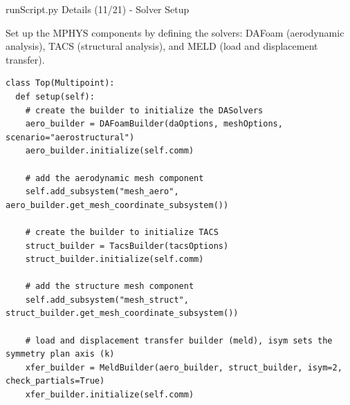 \documentclass{bredelebeamer}
\begin{document}
\begin{frame}[fragile]{runScript.py Details (11/21) - \large Solver Setup}

Set up the MPHYS components by defining the solvers: DAFoam (aerodynamic analysis), TACS (structural analysis), and MELD (load and displacement transfer).

\scriptsize
\lstset{ language=bash }
\begin{lstlisting}
class Top(Multipoint):
  def setup(self):
    # create the builder to initialize the DASolvers
    aero_builder = DAFoamBuilder(daOptions, meshOptions, scenario="aerostructural")
    aero_builder.initialize(self.comm)

    # add the aerodynamic mesh component
    self.add_subsystem("mesh_aero", aero_builder.get_mesh_coordinate_subsystem())

    # create the builder to initialize TACS
    struct_builder = TacsBuilder(tacsOptions)
    struct_builder.initialize(self.comm)

    # add the structure mesh component
    self.add_subsystem("mesh_struct", struct_builder.get_mesh_coordinate_subsystem())

    # load and displacement transfer builder (meld), isym sets the symmetry plan axis (k)
    xfer_builder = MeldBuilder(aero_builder, struct_builder, isym=2, check_partials=True)
    xfer_builder.initialize(self.comm)
\end{lstlisting}
\normalsize
\end{frame}
\end{document}
